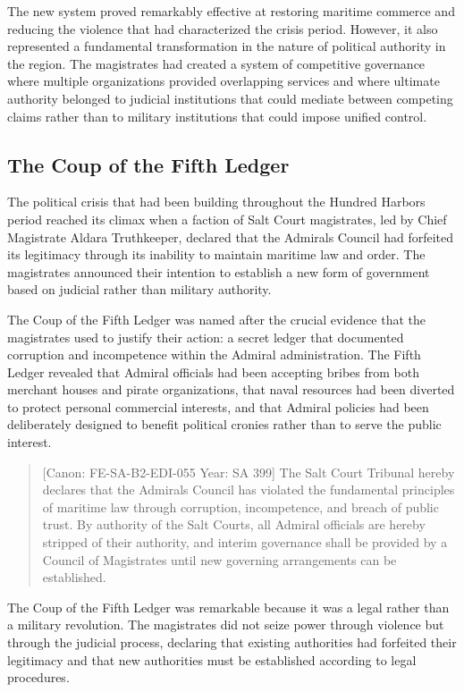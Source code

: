 The new system proved remarkably effective at restoring maritime
commerce and reducing the violence that had characterized the crisis
period. However, it also represented a fundamental transformation in the
nature of political authority in the region. The magistrates had created
a system of competitive governance where multiple organizations provided
overlapping services and where ultimate authority belonged to judicial
institutions that could mediate between competing claims rather than to
military institutions that could impose unified control.

\subsection{The Coup of the Fifth
Ledger}\label{the-coup-of-the-fifth-ledger-1}

The political crisis that had been building throughout the Hundred
Harbors period reached its climax when a faction of Salt Court
magistrates, led by Chief Magistrate Aldara Truthkeeper, declared that
the Admiral\textquotesingle s Council had forfeited its legitimacy
through its inability to maintain maritime law and order. The
magistrates announced their intention to establish a new form of
government based on judicial rather than military authority.

The Coup of the Fifth Ledger was named after the crucial evidence that
the magistrates used to justify their action: a secret ledger that
documented corruption and incompetence within the Admiral
administration. The Fifth Ledger revealed that Admiral officials had
been accepting bribes from both merchant houses and pirate
organizations, that naval resources had been diverted to protect
personal commercial interests, and that Admiral policies had been
deliberately designed to benefit political cronies rather than to serve
the public interest.

\begin{quote}
{[}Canon: FE-SA-B2-EDI-055 \textbar{} Year: SA 399{]} The Salt Court
Tribunal hereby declares that the Admiral\textquotesingle s Council has
violated the fundamental principles of maritime law through corruption,
incompetence, and breach of public trust. By authority of the Salt
Courts, all Admiral officials are hereby stripped of their authority,
and interim governance shall be provided by a Council of Magistrates
until new governing arrangements can be established.
\end{quote}

The Coup of the Fifth Ledger was remarkable because it was a legal
rather than a military revolution. The magistrates did not seize power
through violence but through the judicial process, declaring that
existing authorities had forfeited their legitimacy and that new
authorities must be established according to legal procedures.

